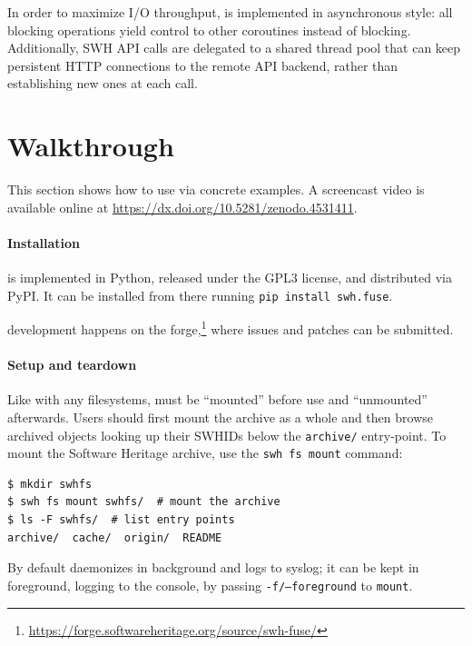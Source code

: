 In order to maximize I/O throughput, \SWHFS{} is implemented in asynchronous
style:
all blocking operations yield control to other coroutines instead of blocking.
%
Additionally, SWH API calls are delegated to a shared thread pool that can keep
persistent HTTP connections to the remote API backend, rather than establishing
new ones at each call.


\section{Walkthrough}
\label{sec:fuse-walkthrough}

This section shows how to use \SWHFS{} via concrete examples. A screencast video
is available online at \url{https://dx.doi.org/10.5281/zenodo.4531411}.

\paragraph{Installation}

\SWHFS{} is implemented in Python, released under the GPL3 license, and
distributed via PyPI.
It can be installed from there running \texttt{pip install swh.fuse}.

\SWHFS{} development happens on the \SWH{}
forge,\footnote{\url{https://forge.softwareheritage.org/source/swh-fuse/}}
where issues and patches can be submitted.

\paragraph{Setup and teardown}

Like with any filesystems, \SWHFS{} must be ``mounted'' before use and
``unmounted'' afterwards. Users should first mount the \SWH{} archive as a whole
and then browse archived objects looking up their SWHIDs below the
\texttt{archive/} entry-point. To mount the Software Heritage archive, use the
\texttt{swh fs mount} command:

\begin{verbatim}
$ mkdir swhfs
$ swh fs mount swhfs/  # mount the archive
$ ls -F swhfs/  # list entry points
archive/  cache/  origin/  README
\end{verbatim}

By default \SWHFS{} daemonizes in background and logs to syslog; it can be kept
in foreground, logging to the console, by passing \texttt{-f/--foreground} to
\texttt{mount}.

